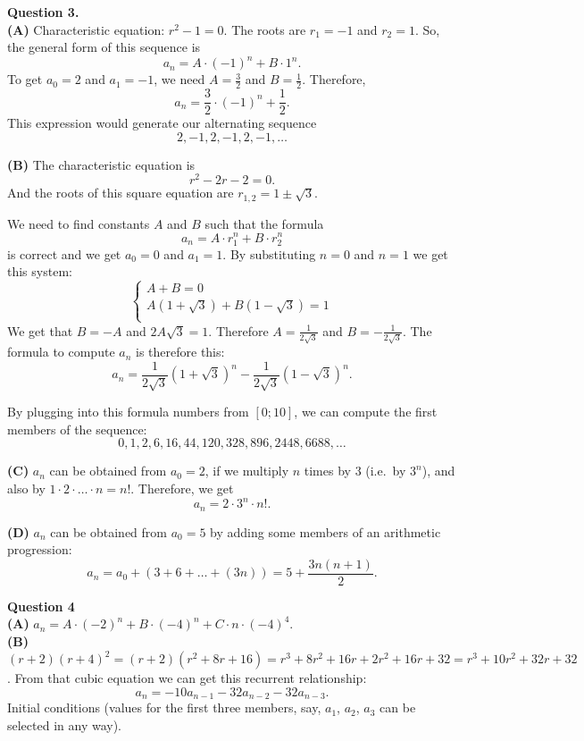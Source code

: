 \documentclass[jou]{apa6}
\begin{document}
\vspace{10pt}
{\bf Question 3.} \\
{\bf (A)} Characteristic equation: $r^2 - 1 = 0$. 
The roots are $r_1 = -1$ and $r_2 = 1$. 
So, the general form of this sequence is 
$$a_n = A \cdot (-1)^n + B \cdot 1^n.$$
To get $a_0 = 2$ and $a_1 = -1$, we need $A = \frac{3}{2}$
and $B = \frac{1}{2}$. Therefore,
$$a_n = \frac{3}{2} \cdot (-1)^n + \frac{1}{2}.$$
This expression would generate our alternating
sequence 
$$2,-1,2,-1,2,-1,\ldots$$

{\bf (B)} The characteristic equation is 
$$r^2 - 2r - 2 = 0.$$
And the roots of this square equation are 
$r_{1,2} = 1 \pm \sqrt{3}$.

We need to find constants $A$ and $B$ such that the formula
$$a_n = A\cdot r_1^n + B\cdot r_2^n$$
is correct and we get $a_0 = 0$ and $a_1 = 1$. 
By substituting $n=0$ and $n=1$ we get this system:
$$\left\{ \begin{array}{l}
A + B = 0\\
A(1 + \sqrt{3}) + B(1 - \sqrt{3}) = 1\\
\end{array} \right.$$
We get that $B = -A$ and $2A\sqrt{3} = 1$. 
Therefore $A = \frac{1}{2\sqrt{3}}$ and 
$B = -\frac{1}{2\sqrt{3}}$. 
The formula to compute $a_n$ is therefore this:
$$a_n = \frac{1}{2\sqrt{3}}\left(1 + \sqrt{3} \right)^n 
-\frac{1}{2\sqrt{3}}\left(1 - \sqrt{3} \right)^n.$$

By plugging into this formula numbers from $[0;10]$, 
we can compute the first members of the sequence:
$$0,1,2,6,16,44,120,328,896,2448,6688,\ldots$$

{\bf (C)} $a_n$ can be obtained from $a_0 = 2$, 
if we multiply $n$ times by $3$ (i.e.\ by $3^n$), 
and also by $1 \cdot 2 \cdot \ldots \cdot n = n!$. 
Therefore, we get
$$a_n = 2 \cdot 3^n \cdot n!.$$

{\bf (D)} $a_n$ can be obtained from $a_0 = 5$ by 
adding some members of an arithmetic progression:
$$a_n = a_0 + (3 + 6 + \ldots + (3n)) = 5 + \frac{3n(n+1)}{2}.$$





\vspace{10pt}
{\bf Question 4}\\
{\bf (A)} $a_n = A\cdot(-2)^n + B\cdot(-4)^n + C\cdot n \cdot (-4)^4$.\\
{\bf (B)} $(r + 2)(r + 4)^2 = (r + 2)(r^2 + 8r + 16) = r^3 + 8r^2 + 16r + 2r^2 + 16r + 32 = r^3 + 10r^2 + 32r + 32$. 
From that cubic equation we can get this recurrent relationship: 
$$a_{n} = -10a_{n-1} - 32a_{n-2} - 32a_{n-3}.$$
Initial conditions (values for the first three members, say, $a_1$, $a_2$, $a_3$ can be selected in any way). 
\end{document}
